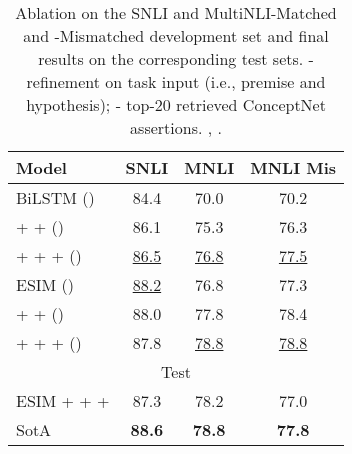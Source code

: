 \documentclass[11pt,a4paper]{article}
\begin{document}
\begin{table}[t]
    \small
    \centering
        \begin{tabular}{l c c c}
            \toprule
            \textbf{Model} & \textbf{SNLI} & \textbf{MNLI} & \textbf{MNLI Mis} \\
            \midrule  
            BiLSTM () & 84.4 & 70.0 & 70.2 \\  
            +  +  () & 86.1 & 75.3 & 76.3 \\  
            +  +  +  () & \underline{86.5} & \underline{76.8} & \underline{77.5} \\
            \midrule
            ESIM () & \underline{88.2} & 76.8 & 77.3 \\  
            +  +  () & 88.0 & 77.8 & 78.4 \\   
            +  +  +  () & 87.8 & \underline{78.8} & \underline{78.8} \\
            \midrule
            \multicolumn{4}{c}{Test} \\
            \midrule
            ESIM +  +  +  & 87.3 & 78.2 & 77.0 \\
            SotA & \textbf{88.6} & \textbf{78.8} & \textbf{77.8} \\  
            \bottomrule
        \end{tabular}    
        \caption{Ablation on the SNLI and MultiNLI-Matched and -Mismatched development set and final results on the corresponding test sets. - refinement on task input (i.e., premise and hypothesis); - top-20 retrieved ConceptNet assertions. \citet{Chen2017_ESIM}, \citet{gong2017natural}.}\label{tab:rte_results}
\end{table}
\end{document}
